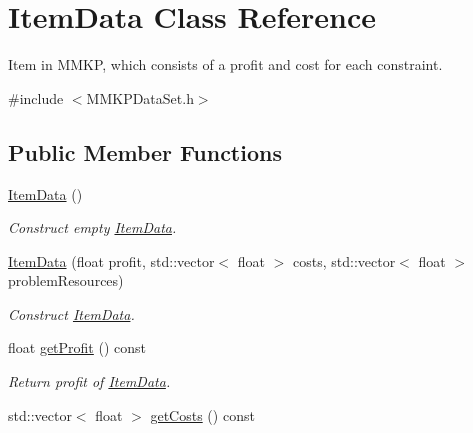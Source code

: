 \hypertarget{class_item_data}{\section{Item\+Data Class Reference}
\label{class_item_data}
}


Item in M\+M\+K\+P, which consists of a profit and cost for each constraint.  




{\ttfamily \#include $<$M\+M\+K\+P\+Data\+Set.\+h$>$}

\subsection*{Public Member Functions}
\begin{DoxyCompactItemize}
\item 
\hypertarget{class_item_data_a3a1b6240b016a82fa65b450f98a35f6c}{\hyperlink{class_item_data_a3a1b6240b016a82fa65b450f98a35f6c}{Item\+Data} ()}\label{class_item_data_a3a1b6240b016a82fa65b450f98a35f6c}

\begin{DoxyCompactList}\small\item\em Construct empty \hyperlink{class_item_data}{Item\+Data}. \end{DoxyCompactList}\item 
\hyperlink{class_item_data_a724e9978670f3dc3160e0e5128b7001e}{Item\+Data} (float profit, std\+::vector$<$ float $>$ costs, std\+::vector$<$ float $>$ problem\+Resources)
\begin{DoxyCompactList}\small\item\em Construct \hyperlink{class_item_data}{Item\+Data}. \end{DoxyCompactList}\item 
\hypertarget{class_item_data_af44bf5f67511a8249f7edc7f9e501fb5}{float \hyperlink{class_item_data_af44bf5f67511a8249f7edc7f9e501fb5}{get\+Profit} () const }\label{class_item_data_af44bf5f67511a8249f7edc7f9e501fb5}

\begin{DoxyCompactList}\small\item\em Return profit of \hyperlink{class_item_data}{Item\+Data}. \end{DoxyCompactList}\item 
\hypertarget{class_item_data_a9341a1a66ac5933ef7dcf217074a05c2}{std\+::vector$<$ float $>$ \hyperlink{class_item_data_a9341a1a66ac5933ef7dcf217074a05c2}{get\+Costs} () const }\label{class_item_data_a9341a1a66ac5933ef7dcf217074a05c2}


\end{DoxyCompactItemize}
